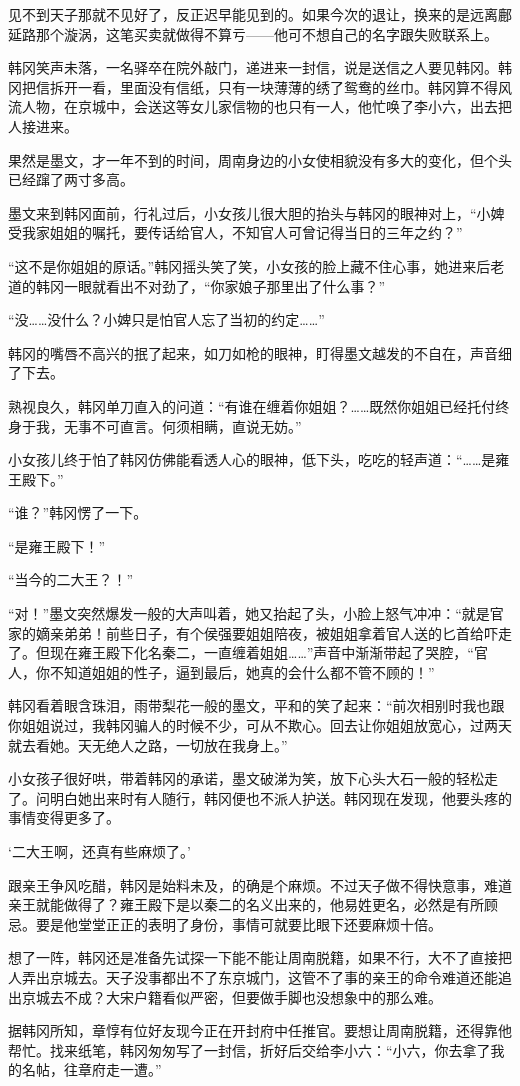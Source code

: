 见不到天子那就不见好了，反正迟早能见到的。如果今次的退让，换来的是远离鄜延路那个漩涡，这笔买卖就做得不算亏——他可不想自己的名字跟失败联系上。

韩冈笑声未落，一名驿卒在院外敲门，递进来一封信，说是送信之人要见韩冈。韩冈把信拆开一看，里面没有信纸，只有一块薄薄的绣了鸳鸯的丝巾。韩冈算不得风流人物，在京城中，会送这等女儿家信物的也只有一人，他忙唤了李小六，出去把人接进来。

果然是墨文，才一年不到的时间，周南身边的小女使相貌没有多大的变化，但个头已经蹿了两寸多高。

墨文来到韩冈面前，行礼过后，小女孩儿很大胆的抬头与韩冈的眼神对上，“小婢受我家姐姐的嘱托，要传话给官人，不知官人可曾记得当日的三年之约？”

“这不是你姐姐的原话。”韩冈摇头笑了笑，小女孩的脸上藏不住心事，她进来后老道的韩冈一眼就看出不对劲了，“你家娘子那里出了什么事？”

“没……没什么？小婢只是怕官人忘了当初的约定……”

韩冈的嘴唇不高兴的抿了起来，如刀如枪的眼神，盯得墨文越发的不自在，声音细了下去。

熟视良久，韩冈单刀直入的问道：“有谁在缠着你姐姐？……既然你姐姐已经托付终身于我，无事不可直言。何须相瞒，直说无妨。”

小女孩儿终于怕了韩冈仿佛能看透人心的眼神，低下头，吃吃的轻声道：“……是雍王殿下。”

“谁？”韩冈愣了一下。

“是雍王殿下！”

“当今的二大王？！”

“对！”墨文突然爆发一般的大声叫着，她又抬起了头，小脸上怒气冲冲：“就是官家的嫡亲弟弟！前些日子，有个侯强要姐姐陪夜，被姐姐拿着官人送的匕首给吓走了。但现在雍王殿下化名秦二，一直缠着姐姐……”声音中渐渐带起了哭腔，“官人，你不知道姐姐的性子，逼到最后，她真的会什么都不管不顾的！”

韩冈看着眼含珠泪，雨带梨花一般的墨文，平和的笑了起来：“前次相别时我也跟你姐姐说过，我韩冈骗人的时候不少，可从不欺心。回去让你姐姐放宽心，过两天就去看她。天无绝人之路，一切放在我身上。”

小女孩子很好哄，带着韩冈的承诺，墨文破涕为笑，放下心头大石一般的轻松走了。问明白她出来时有人随行，韩冈便也不派人护送。韩冈现在发现，他要头疼的事情变得更多了。

‘二大王啊，还真有些麻烦了。’

跟亲王争风吃醋，韩冈是始料未及，的确是个麻烦。不过天子做不得快意事，难道亲王就能做得了？雍王殿下是以秦二的名义出来的，他易姓更名，必然是有所顾忌。要是他堂堂正正的表明了身份，事情可就要比眼下还要麻烦十倍。

想了一阵，韩冈还是准备先试探一下能不能让周南脱籍，如果不行，大不了直接把人弄出京城去。天子没事都出不了东京城门，这管不了事的亲王的命令难道还能追出京城去不成？大宋户籍看似严密，但要做手脚也没想象中的那么难。

据韩冈所知，章惇有位好友现今正在开封府中任推官。要想让周南脱籍，还得靠他帮忙。找来纸笔，韩冈匆匆写了一封信，折好后交给李小六：“小六，你去拿了我的名帖，往章府走一遭。”

